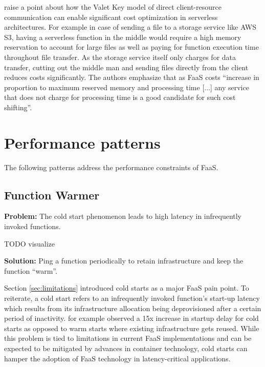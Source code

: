 \textcite{adzic2017serverless} raise a point about how the Valet Key model of direct client-resource communication can enable significant cost optimization in serverless architectures. For example in case of sending a file to a storage service like AWS S3, having a serverless function in the middle would require a high memory reservation to account for large files as well as paying for function execution time throughout file transfer. As the storage service itself only charges for data transfer, cutting out the middle man and sending files directly from the client reduces costs significantly. The authors emphasize that as FaaS costs ``increase in proportion to maximum reserved memory and processing time [...] any service that does not charge for processing time is a good candidate for such cost shifting''.



\section{Performance patterns} \label{sec:perfPatterns}

The following patterns address the performance constraints of FaaS.

\subsection{Function Warmer} \label{subsec:FunctionWarmer}

\textbf{Problem:} The cold start phenomenon leads to high latency in infrequently invoked functions.

TODO visualize

\textbf{Solution:} Ping a function periodically to retain infrastructure and keep the function ``warm''.

Section \ref{sec:limitations} introduced cold starts as a major FaaS pain point. To reiterate, a cold start refers to an infrequently invoked function's start-up latency which results from its infrastructure allocation being deprovisioned after a certain period of inactivity. \textcite{lloydserverless} for example observed a 15x increase in startup delay for cold starts as opposed to warm starts where existing infrastructure gets reused. While this problem is tied to limitations in current FaaS implementations and can be expected to be mitigated by advances in container technology, cold starts can hamper the adoption of FaaS technology in latency-critical applications.

